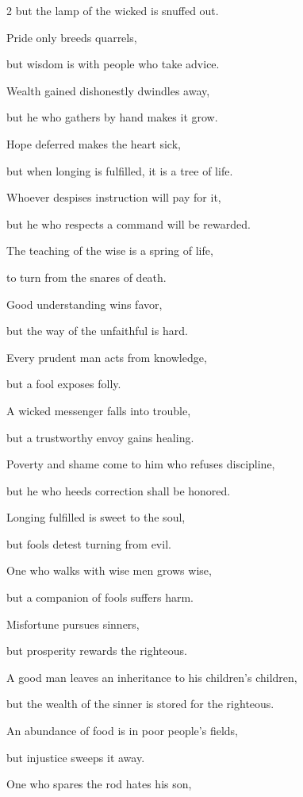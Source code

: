 \begin{multicols}{2}
but the lamp of the wicked is snuffed out.


\myverse{}Pride only breeds quarrels,

but wisdom is with people who take advice.


\myverse{}Wealth gained dishonestly dwindles away,

but he who gathers by hand makes it grow.


\myverse{}Hope deferred makes the heart sick,

but when longing is fulfilled, it is a tree of life.


\myverse{}Whoever despises instruction will pay for it,

but he who respects a command will be rewarded.


\myverse{}The teaching of the wise is a spring of life,

to turn from the snares of death.


\myverse{}Good understanding wins favor,

but the way of the unfaithful is hard.


\myverse{}Every prudent man acts from knowledge,

but a fool exposes folly.


\myverse{}A wicked messenger falls into trouble,

but a trustworthy envoy gains healing.


\myverse{}Poverty and shame come to him who refuses discipline,

but he who heeds correction shall be honored.


\myverse{}Longing fulfilled is sweet to the soul,

but fools detest turning from evil.


\myverse{}One who walks with wise men grows wise,

but a companion of fools suffers harm.


\myverse{}Misfortune pursues sinners,

but prosperity rewards the righteous.


\myverse{}A good man leaves an inheritance to his children’s children,

but the wealth of the sinner is stored for the righteous.


\myverse{}An abundance of food is in poor people’s fields,

but injustice sweeps it away.


\myverse{}One who spares the rod hates his son,


\end{multicols}
